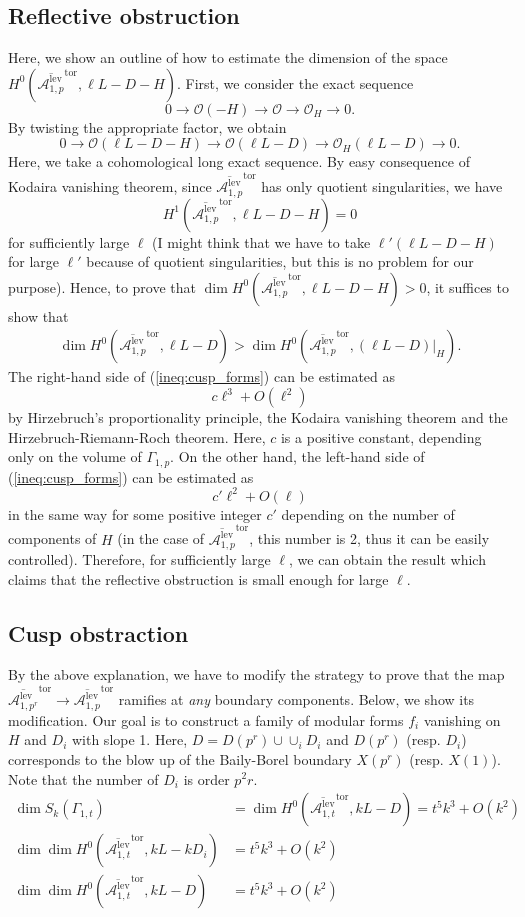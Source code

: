 \documentclass[12pt, pdftex]{amsart}
\theoremstyle{plain}
\theoremstyle{definition}
\numberwithin{equation}{section}
\def\A{{\mathbb A}}
\def\dim{\mathop{\mathrm{dim}}\nolimits}
\def\tor{\mathrm{tor}}
\def\lev{\mathrm{lev}}
\def\OO{\mathscr{O}}
\def\A{\mathcal{A}}
\begin{document}
\subsection{Reflective obstruction}
Here, we show an outline of how to estimate the dimension of the space $H^0(\overline{\A^{\lev}_{1,p}}^{\tor}, \ell L-D-H)$.
First, we consider the exact sequence 
\[0\to\OO(-H)\to\OO\to\OO_H\to 0.\]
By twisting the appropriate factor, we obtain
\[0\to\OO(\ell L-D-H)\to\OO(\ell L-D)\to\OO_H(\ell L-D)\to 0.\]
Here, we take a cohomological long exact sequence.
By easy consequence of Kodaira vanishing theorem, since $\overline{\A^{\lev}_{1,p}}^{\tor}$ has only quotient singularities, we have
\[H^1(\overline{\A^{\lev}_{1,p}}^{\tor}, \ell L-D-H)=0\]
for sufficiently large $\ell$ (I might think that we have to take $\ell'(\ell L-D-H)$ for large $\ell'$ because of quotient singularities, but this is no problem for our purpose).
Hence, to prove that $\dim H^0(\overline{\A^{\lev}_{1,p}}^{\tor}, \ell L-D-H) >0$, it suffices to show that 
\begin{align}
\label{ineq:cusp_forms}
\dim H^0(\overline{\A^{\lev}_{1,p}}^{\tor}, \ell L-D)>\dim H^0(\overline{\A^{\lev}_{1,p}}^{\tor}, (\ell L-D)\vert_H).
\end{align}
The right-hand side of (\ref{ineq:cusp_forms}) can be estimated as 
\[c\ell^3+O(\ell^2)\]
by Hirzebruch's proportionality principle, the Kodaira vanishing theorem and the Hirzebruch-Riemann-Roch theorem.
Here, $c$ is a positive constant, depending only on the volume of $\Gamma_{1,p}$.
On the other hand, the left-hand side of (\ref{ineq:cusp_forms}) can be estimated as 
\[c'\ell^2+O(\ell)\]
in the same way for some positive integer $c'$ depending on the number of components of $H$ (in the case of $\overline{\A^{\lev}_{1,p}}^{\tor}$, this number is 2, thus it can be easily controlled).
Therefore, for sufficiently large $\ell$, we can obtain the result which claims that the reflective obstruction is small enough for large $\ell$.

\subsection{Cusp obstraction}
By the above explanation, we have to modify the strategy to prove that the map $\overline{\A^{\lev}_{1,p^r}}^{\tor}\to \overline{\A^{\lev}_{1,p}}^{\tor}$ ramifies at \textit{any} boundary components.  
Below, we show its modification.
Our goal is to construct a family of modular forms $f_i$ vanishing on $H$ and $D_i$ with slope 1.
Here, $D=D(p^r)\cup \cup_i D_i$ and $D(p^r)$ (resp. $D_i$) corresponds to the blow up of the Baily-Borel boundary $X(p^r)$ (resp. $X(1)$).
Note that the number of $D_i$ is order $p^2r$.
\begin{align}
\dim S_k(\Gamma_{1,t})&=\dim H^0(\overline{\A^{\lev}_{1,t}}^{\tor}, kL-D)=t^5k^3+O(k^2)\\
\dim \dim H^0(\overline{\A^{\lev}_{1,t}}^{\tor}, kL-kD_i)&=t^5k^3+O(k^2)\\
\dim \dim H^0(\overline{\A^{\lev}_{1,t}}^{\tor}, kL-D)&=t^5k^3+O(k^2)
\end{align}
\end{document}
